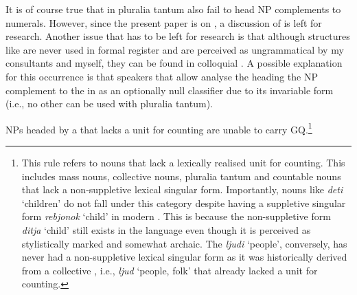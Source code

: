 \documentclass[output=paper,modfonts,newtxmath,hidelinks]{langscibook}
\begin{document}
{\begin{multicols}{2}
\end{multicols}

\noindent It is of course true that in  pluralia tantum also fail to head NP complements to numerals. However, since the present paper is on , a discussion of  is left for  research. Another issue that has to be left for  research is that although structures like  are never used in formal register and are perceived as ungrammatical by my consultants and myself, they can be found in colloquial . A possible explanation for this occurrence is that speakers that allow  analyse the  heading the NP complement to the  in  as an optionally null classifier due to its invariable form (i.e., no other  can be used with pluralia tantum).}
\newpage 

\ea \label{18:ex8} NPs headed by a  that lacks a unit for counting are unable to carry GQ.\label{18:ex:key:8}\footnote{\label{18:fn5}This rule refers to nouns that lack a lexically realised unit for counting. This includes mass nouns, collective nouns, pluralia tantum and countable nouns that lack a non-suppletive lexical singular form. Importantly, nouns like \textit{deti} ‘children’ do not fall under this category despite having a suppletive singular form \textit{rebjonok} ‘child’ in modern . This is because the non-suppletive form \textit{ditja} ‘child’ still exists in the language even though it is perceived as stylistically marked and somewhat archaic.  The  \textit{ljudi} ‘people’, conversely, has never had a non-suppletive lexical singular form as it was historically derived from a collective , i.e., \textit{ljud} ‘people, folk’ \citep{Chumakina-etal2004} that already lacked a unit for counting.
}

    \z
\end{document}
